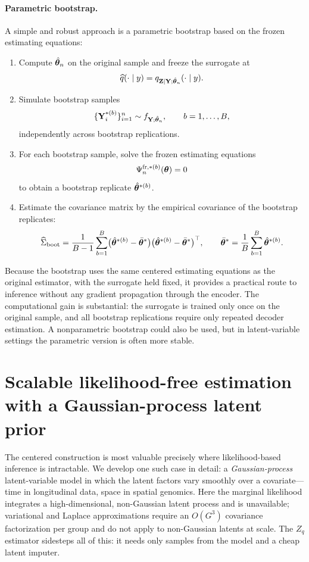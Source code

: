 \documentclass[twoside,11pt]{article}
\begin{document}
\paragraph{Parametric bootstrap.}
A simple and robust approach is a parametric bootstrap based on the frozen estimating equations:
\begin{enumerate}
\item Compute \(\hat{{\bm{\theta}}}_n\) on the original sample and freeze the surrogate at
\[
\widehat q(\cdot\mid y)=q_{{\bf Z}\mid{\bf Y};\hat{{\bm{\theta}}}_n}(\cdot\mid y).
\]
\item Simulate bootstrap samples
\[
\{{\bf Y}_i^{*(b)}\}_{i=1}^n \sim f_{{\bf Y};\hat{{\bm{\theta}}}_n},
\qquad
b=1,\dots,B,
\]
independently across bootstrap replications.
\item For each bootstrap sample, solve the frozen estimating equations
\[
\Psi_n^{\mathrm{fr},*(b)}({\bm{\theta}})=0
\]
to obtain a bootstrap replicate \(\hat{{\bm{\theta}}}^{*(b)}\).
\item Estimate the covariance matrix by the empirical covariance of the bootstrap replicates:
\[
\widehat\Sigma_{\mathrm{boot}}
=
\frac{1}{B-1}\sum_{b=1}^B
\bigl(\hat{{\bm{\theta}}}^{*(b)}-\bar{{\bm{\theta}}}^*\bigr)
\bigl(\hat{{\bm{\theta}}}^{*(b)}-\bar{{\bm{\theta}}}^*\bigr)^\top,
\qquad
\bar{{\bm{\theta}}}^*=\frac{1}{B}\sum_{b=1}^B \hat{{\bm{\theta}}}^{*(b)}.
\]
\end{enumerate}

Because the bootstrap uses the same centered estimating equations as the original estimator, with the surrogate held fixed, it provides a practical route to inference without any gradient propagation through the encoder. The computational gain is substantial: the surrogate is trained only once on the original sample, and all bootstrap replications require only repeated decoder estimation. A nonparametric bootstrap could also be used, but in latent-variable settings the parametric version is often more stable.


%
\section{Scalable likelihood-free estimation with a Gaussian-process latent prior}
\label{sec:gpgllvm}

The centered construction is most valuable precisely where likelihood-based inference is intractable. We develop one such case in detail: a \emph{Gaussian-process} latent-variable model in which the latent factors vary smoothly over a covariate---time in longitudinal data, space in spatial genomics. Here the marginal likelihood integrates a high-dimensional, non-Gaussian latent process and is unavailable; variational and Laplace approximations require an $O(G^3)$ covariance factorization per group and do not apply to non-Gaussian latents at scale. The $Z_q$ estimator sidesteps all of this: it needs only samples from the model and a cheap latent imputer.
\end{document}
